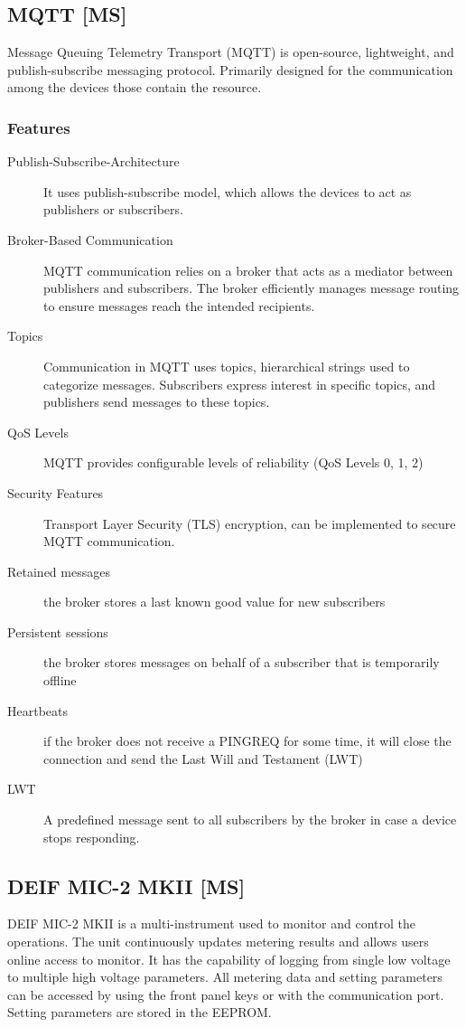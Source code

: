 	\subsection{MQTT [MS]}
		Message Queuing Telemetry Transport (MQTT) is open-source, lightweight, and publish-subscribe
		messaging protocol. Primarily designed for the communication among the devices those contain the
		resource.
		
		\subsubsection*{Features}
			\begin{description}
				\item[Publish-Subscribe-Architecture]  It uses publish-subscribe model, which allows the devices to act as
				publishers or subscribers.
				\item[Broker-Based Communication]  MQTT communication relies on a broker that acts as a mediator
				between publishers and subscribers. The broker efficiently manages message routing to ensure
				messages reach the intended recipients.
				\item[Topics]  Communication in MQTT uses topics, hierarchical strings used to categorize messages.
				Subscribers express interest in specific topics, and publishers send messages to these topics.
				\item[\acf{QoS} Levels] MQTT provides configurable levels of reliability (QoS Levels 0, 1,
				2)
				\item[Security Features] Transport Layer Security (TLS) encryption, can be implemented to secure MQTT
				communication.
				\item[Retained messages] the broker stores a last known good value for new subscribers
				\item[Persistent sessions] the broker stores messages on behalf of a subscriber that is temporarily offline
				\item[Heartbeats]  if the broker does not receive a PINGREQ for some time, it will close the connection and
				send the Last Will and Testament (LWT)
				\item[\acf{LWT}] A predefined message sent to all subscribers by the broker in case a
				device stops responding.
			\end{description}
	
	\subsection{DEIF MIC-2 MKII [MS]}
		DEIF MIC-2 MKII is a multi-instrument used to monitor and control the operations. The unit
		continuously updates metering results and allows users online access to monitor. It has the
		capability of logging from single low voltage to multiple high voltage parameters. All
		metering data and setting parameters can be accessed by using the front panel keys or with the
		communication port. Setting parameters are stored in the EEPROM.
		
